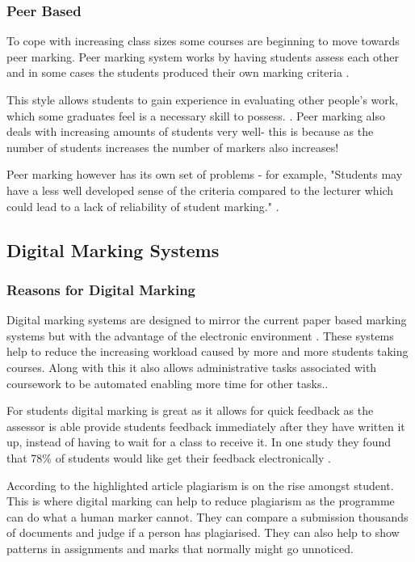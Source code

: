\documentclass[12pt]{article}  %
\begin{document}
\subsubsection{Peer Based}
To cope with increasing class sizes some courses are beginning to move towards peer marking. Peer marking system works by having students assess each other and in some cases  the students produced their own marking criteria \cite{orsmond_use_2000}.

This style allows  students to gain experience in evaluating other people's work, which some graduates feel is a necessary skill to possess. \cite{langan_insights_nodate}. Peer marking also deals with increasing amounts of students very well- this is because as the number of students increases the number of markers also increases!

Peer marking however has its own set of problems - for example, "Students may have a less well developed sense of the criteria compared to the lecturer which could lead to a lack of reliability of student marking." \cite{orsmond_use_2000}.



\subsection{Digital Marking Systems}

\subsubsection{Reasons for Digital Marking}
Digital marking systems are designed to mirror the current paper based marking systems but with the advantage of the electronic environment \cite{heinrich_online_2003}. These systems help to reduce the increasing workload caused by more and more students taking courses. Along with this it also allows administrative tasks associated with coursework to be automated enabling more time for other tasks.\cite{joy_effective_1998}.

For students digital marking is great as it allows for quick feedback as the assessor is able provide students feedback immediately after they have written it up, instead of having to wait for a class to receive it. In one study\cite{dahl_turnitin_2007} they found that 78\% of students would like get their feedback  electronically .

According to the highlighted article \cite{derby_duplication_2008} plagiarism is on the rise amongst student. This is where digital marking can help to reduce plagiarism as the programme can  do what a human marker cannot. They can compare a submission thousands of documents and judge if a person has plagiarised. They can also help to show patterns in assignments and marks that normally might go unnoticed.
\end{document}
